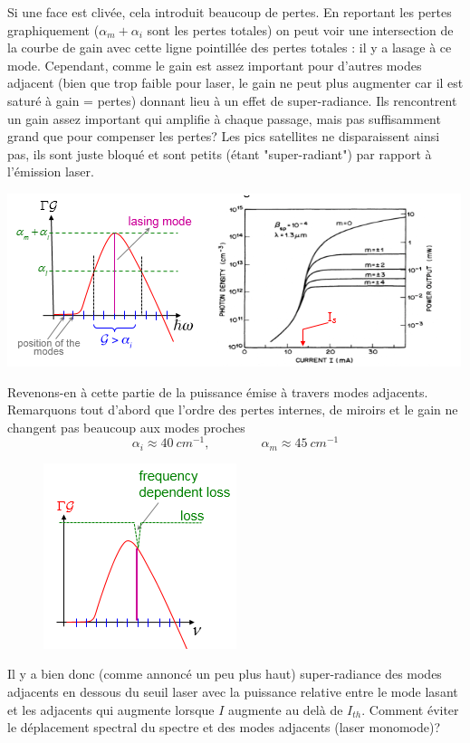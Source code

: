 	Si une face est clivée, cela introduit beaucoup de pertes. En reportant les pertes graphiquement 
	($\alpha_m+\alpha_i$ sont les pertes totales) on peut voir une intersection de la courbe de gain
	avec cette ligne pointillée des pertes totales : il y a lasage à ce mode. Cependant, comme le gain
	est assez important pour d'autres modes adjacent (bien que trop faible pour laser, le gain ne 
	peut plus augmenter car il est saturé à gain = pertes) donnant lieu à un effet de super-radiance. 
	Ils rencontrent un gain assez important qui amplifie à chaque passage, mais pas suffisamment grand 
	que pour compenser les pertes? Les pics satellites ne disparaissent ainsi pas, ils sont juste 
	bloqué et sont petits (étant "super-radiant") par rapport à l'émission laser.
	\begin{center}
	\includegraphics[scale=0.8]{ch5/image54}
	\end{center}
	Revenons-en à cette partie de la puissance émise à travers modes adjacents. Remarquons tout 
	d'abord que l'ordre des pertes internes, de miroirs et le gain ne changent pas beaucoup aux 
	modes proches
	\begin{equation}
	\alpha_i\approx 40\ cm^{-1},\qquad\qquad \alpha_m\approx 45\ cm^{-1}
	\end{equation}

	\begin{figure}
	\vspace{-7mm}
	\includegraphics[scale=0.7]{ch5/image55}
	\end{figure}
	Il y a bien donc (comme annoncé un peu plus haut) super-radiance des modes adjacents en dessous
	du seuil laser avec la puissance relative entre le mode lasant et les adjacents qui augmente
	lorsque $I$ augmente au delà de $I_{th}$. Comment éviter le déplacement spectral du spectre et 
	des modes adjacents (laser monomode)?\\
			
